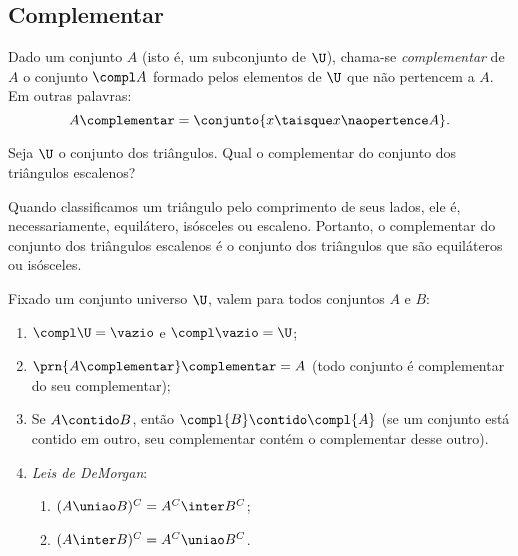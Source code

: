 \subsection{Complementar}

\begin{definition}[Complementar]
	\label{def:complementar}
	Dado um conjunto $A$ (isto é, um subconjunto de $\U$), chama-se \emph{complementar} de $A$ o conjunto $\compl A$ formado pelos elementos de $\U$ que não pertencem a $A$.
	Em outras palavras:
	\[
		A\complementar = \conjunto{ x \taisque x \naopertence A}.
	\]
\end{definition}

\begin{example}
	Seja $\U$ o conjunto dos triângulos. Qual o complementar do conjunto dos triângulos escalenos?
\end{example}

\begin{solution}
	Quando classificamos um triângulo pelo comprimento de seus lados, ele é, necessariamente, equilátero, isósceles ou escaleno. Portanto, o complementar do conjunto dos triângulos escalenos é o conjunto dos triângulos que são equiláteros ou isósceles.
\end{solution}

\begin{proposition}
	\label{prop:complementar}
	Fixado um conjunto universo $\U$, valem para todos conjuntos $A$ e $B$:
	\begin{enumerate}
		\item
			\label{prop:complementar:universo}
			$\compl\U = \vazio$ e $\compl\vazio = \U$;
		\item
			\label{prop:complementar:complementar-do-complementar}
			$\prn{A\complementar}\complementar = A$ (todo conjunto é complementar do seu complementar);
		\item
			\label{prop:complementar:contrapositiva}
			Se $A \contido B$, então $\compl{B} \contido \compl{A}$ (se um conjunto está contido em outro, seu complementar contém o complementar desse outro).
			
		\item
			\label{prop:demorgan}
			\emph{Leis de DeMorgan}:
			\begin{enumerate}
				\item $(A \uniao B)^C = A^C \inter B^C$;
				\item $(A \inter B)^C = A^C \uniao B^C$.
			\end{enumerate} 
	\end{enumerate}
\end{proposition}

